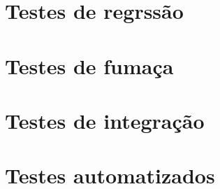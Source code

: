     \section{Testes de regrssão}

    \section{Testes de fumaça}

    \section{Testes de integração}

    \section{Testes automatizados}
